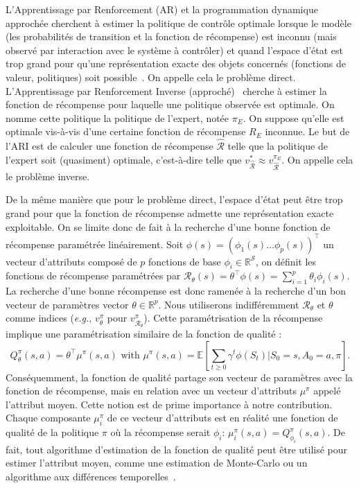 \documentclass[english,utf8]{./hermes-journal}
\newcommand{\R}{\mathcal{R}}
\newcommand{\s}{\mathcal{S}}
\newcommand{\E}{\mathbb{E}}
\begin{document}
L'Apprentissage par Renforcement (AR) et la programmation dynamique approchée cherchent à estimer la politique de contrôle optimale lorsque le modèle (les probabilités de transition et la fonction de récompense) est inconnu (mais observé par interaction avec le système à contrôler) et quand l'espace d'état est trop grand pour qu'une représentation exacte des objets concernés (fonctions de valeur, politiques) soit possible~\cite{Bertsekas:1996,Sutton:1998,szepesvari2010c}.
%
On appelle cela le problème direct.
%
L'Apprentissage par Renforcement Inverse (approché)~\cite{Ng:2000} cherche à estimer la fonction de récompense pour laquelle une politique observée est optimale.
%
On nomme cette politique la politique de l'expert, notée $\pi_E$. On suppose qu'elle est optimale vis-à-vis d'une certaine fonction de récompense $R_E$ inconnue. Le but de l'ARI est de calculer une fonction de récompense $\hat{\R}$ telle que la politique de l'expert soit (quasiment) optimale, c'est-à-dire telle que $v^*_{\hat{\R}}
\approx v^{\pi_E}_{\hat{\R}}$.
%
On appelle cela le problème inverse.

De la même manière que pour le problème direct, l'espace d'état peut être trop grand pour que la fonction de récompense admette une représentation exacte exploitable. On se limite donc de fait à la recherche d'une bonne fonction de récompense paramétrée linéairement. Soit $\phi(s) = (\phi_1(s)  \dots
\phi_p(s))^\top$
un vecteur d'attributs composé de $p$ fonctions de base $\phi_i\in\mathbb{R}^\s$, on définit les fonctions de récompense paramétrées par $\R_\theta(s) = \theta^\top \phi(s) = \sum_{i=1}^p
\theta_i \phi_i(s)$.
La recherche d'une bonne récompense est donc ramenée à la recherche d'un bon vecteur de paramètres vector $\theta \in\mathbb{R}^p$. Nous utiliserons indifféremment $\R_\theta$ et $\theta$ comme indices (\textit{e.g.}, $v_\theta^\pi$ pour $v_{\R_\theta}^\pi$).
Cette paramétrisation de la récompense implique une paramétrisation similaire de la fonction de qualité :
\begin{equation}
  Q^\pi_\theta(s,a) = \theta^\top \mu^\pi(s,a) \text{ with }
  \mu^\pi(s,a) = \E[\sum_{t\geq 0} \gamma^t
  \phi(S_t)|S_0=s,A_0=a,\pi].
  \label{eq:def:mu}
\end{equation}
Conséquemment, la fonction de qualité partage son vecteur de paramètres avec la fonction de récompense, mais en relation avec un vecteur d'attributs $\mu^\pi$ appelé l'attribut moyen. Cette notion est de prime importance à notre contribution. Chaque composante $\mu_i^\pi$ de ce vecteur d'attributs est en réalité une fonction de qualité de la politique $\pi$ où la récompense serait $\phi_i$: $\mu_i^\pi(s,a) = Q^\pi_{\phi_i}(s,a)$. De fait, tout algorithme d'estimation de la fonction de qualité peut être utilisé pour estimer l'attribut moyen, comme une estimation de Monte-Carlo ou un algorithme aux différences temporelles~\cite{Klein:2011}.
\end{document}
